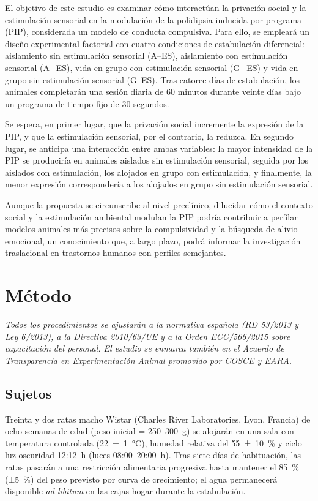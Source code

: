 \documentclass[12pt,a4paper]{article}
\begin{document}
\begin{multicols}{2}
El objetivo de este estudio es examinar cómo interactúan la privación social y la estimulación sensorial en la modulación de la polidipsia inducida por programa (PIP), considerada un modelo de conducta compulsiva. Para ello, se empleará un diseño experimental factorial con cuatro condiciones de estabulación diferencial: aislamiento sin estimulación sensorial (A--ES), aislamiento con estimulación sensorial (A+ES), vida en grupo con estimulación sensorial (G+ES) y vida en grupo sin estimulación sensorial (G--ES). Tras catorce días de estabulación, los animales completarán una sesión diaria de 60 minutos durante veinte días bajo un programa de tiempo fijo de 30 segundos.

Se espera, en primer lugar, que la privación social incremente la expresión de la PIP, y que la estimulación sensorial, por el contrario, la reduzca. En segundo lugar, se anticipa una interacción entre ambas variables: la mayor intensidad de la PIP se produciría en animales aislados sin estimulación sensorial, seguida por los aislados con estimulación, los alojados en grupo con estimulación, y finalmente, la menor expresión correspondería a los alojados en grupo sin estimulación sensorial.

Aunque la propuesta se circunscribe al nivel preclínico, dilucidar cómo el contexto social y la estimulación ambiental modulan la PIP podría contribuir a perfilar modelos animales más precisos sobre la compulsividad y la búsqueda de alivio emocional, un conocimiento que, a largo plazo, podrá informar la investigación traslacional en trastornos humanos con perfiles semejantes.


\section{Método}

\textit{Todos los procedimientos se ajustarán a la normativa española (RD 53/2013 y Ley 6/2013), a la Directiva 2010/63/UE y a la Orden ECC/566/2015 sobre capacitación del personal. El estudio se enmarca también en el Acuerdo de Transparencia en Experimentación Animal promovido por COSCE y EARA.}

\subsection*{Sujetos}

Treinta y dos ratas macho Wistar (Charles River Laboratories, Lyon, Francia) de ocho semanas de edad (peso inicial = 250–300~g) se alojarán en una sala con temperatura controlada (22~±~1~°C), humedad relativa del 55~±~10~\% y ciclo luz-oscuridad 12:12~h (luces 08:00–20:00~h). Tras siete días de habituación, las ratas pasarán a una restricción alimentaria progresiva hasta mantener el 85~\% (±5~\%) del peso previsto por curva de crecimiento; el agua permanecerá disponible \textit{ad libitum} en las cajas hogar durante la estabulación.


\end{multicols}
\end{document}
